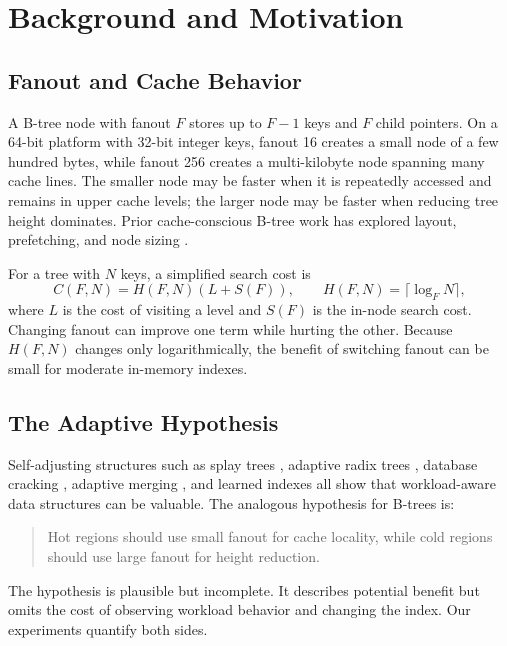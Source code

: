 \documentclass[sigconf,screen]{acmart}
\begin{document}
\section{Background and Motivation}

\subsection{Fanout and Cache Behavior}

A B-tree node with fanout \(F\) stores up to \(F-1\) keys and \(F\) child
pointers.  On a 64-bit platform with 32-bit integer keys, fanout 16 creates a
small node of a few hundred bytes, while fanout 256 creates a multi-kilobyte
node spanning many cache lines.  The smaller node may be faster when it is
repeatedly accessed and remains in upper cache levels; the larger node may be
faster when reducing tree height dominates.  Prior cache-conscious B-tree work
has explored layout, prefetching, and node sizing
\cite{rao1999cache,rao2000making,chen2001fractal,ailamaki1999dbmson}.

For a tree with \(N\) keys, a simplified search cost is
\[
  C(F,N) = H(F,N)(L + S(F)),
  \qquad H(F,N)=\lceil \log_F N\rceil ,
\]
where \(L\) is the cost of visiting a level and \(S(F)\) is the in-node search
cost.  Changing fanout can improve one term while hurting the other.  Because
\(H(F,N)\) changes only logarithmically, the benefit of switching fanout can be
small for moderate in-memory indexes.

\subsection{The Adaptive Hypothesis}

Self-adjusting structures such as splay trees \cite{sleator1985self},
adaptive radix trees \cite{leis2013adaptive}, database cracking
\cite{idreos2007database}, adaptive merging \cite{idreos2011adaptive}, and
learned indexes \cite{kraska2018case,ding2020alex,galakatos2019fiting} all
show that workload-aware data structures can be valuable.  The analogous
hypothesis for B-trees is:

\begin{quote}
Hot regions should use small fanout for cache locality, while cold regions
should use large fanout for height reduction.
\end{quote}

The hypothesis is plausible but incomplete.  It describes potential benefit
but omits the cost of observing workload behavior and changing the index.  Our
experiments quantify both sides.
\end{document}
